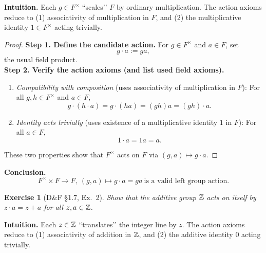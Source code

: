 \documentclass[12pt]{article}
\newtheorem{exercise}[theorem]{Exercise}
\theoremstyle{definition}
\begin{document}
\dotfill

\noindent\textbf{Intuition.}
Each $g\in F^\times$ “scales’’ $F$ by ordinary multiplication. The action axioms reduce to (1) associativity of multiplication in $F$, and (2) the multiplicative identity $1\in F^\times$
acting trivially.

\dotfill

\begin{proof}
\noindent\textbf{Step 1. Define the candidate action.}
For $g\in F^\times$ and $a\in F$, set
\[
g\cdot a:=ga,
\]
the usual field product.\\

\noindent\textbf{Step 2. Verify the action axioms (and list used field axioms).}
\begin{enumerate}
  \item \emph{Compatibility with composition} (uses associativity of multiplication in $F$):  
  For all $g,h\in F^\times$ and $a\in F$,
  \[
  g\cdot(h\cdot a)=g\cdot(ha)=(gh)a=(gh)\cdot a.
  \]
  \item \emph{Identity acts trivially} (uses existence of a multiplicative identity $1$ in $F$):  
  For all $a\in F$,
  \[
  1\cdot a=1a=a.
  \]
\end{enumerate}

\noindent
These two properties show that $F^\times$ acts on $F$ via $(g,a)\mapsto g\cdot a$.
\end{proof}

\noindent\textbf{Conclusion.}
\[
\boxed{\,F^\times \times F \to F,\ (g,a)\mapsto g \cdot a = ga\ \text{is a valid left group action.}\,}
\]

\newpage

\begin{exercise}[D\&F §1.7, Ex.~2]
Show that the additive group $\Bbb Z$ acts on itself by $z \cdot a = z + a$ for all $z,a \in \Bbb Z$.
\end{exercise}

\dotfill

\noindent\textbf{Intuition.}
Each $z\in\Bbb Z$ “translates’’ the integer line by $z$. The action axioms reduce to
(1) associativity of addition in $\Bbb Z$, and (2) the additive identity $0$ acting trivially.

\dotfill
\end{document}

